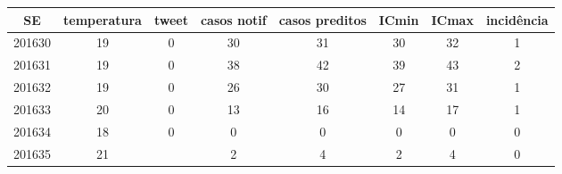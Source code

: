 \begin{tabular}{c|ccccccc}
  \hline
SE & temperatura & tweet & casos notif & casos preditos & ICmin & ICmax & incidência \\ 
  \hline
201630 & 19 & 0 & 30 & 31 & 30 & 32 & 1 \\ 
  201631 & 19 & 0 & 38 & 42 & 39 & 43 & 2 \\ 
  201632 & 19 & 0 & 26 & 30 & 27 & 31 & 1 \\ 
  201633 & 20 & 0 & 13 & 16 & 14 & 17 & 1 \\ 
  201634 & 18 & 0 & 0 & 0 & 0 & 0 & 0 \\ 
  201635 & 21 &  & 2 & 4 & 2 & 4 & 0 \\ 
   \hline
\end{tabular}
